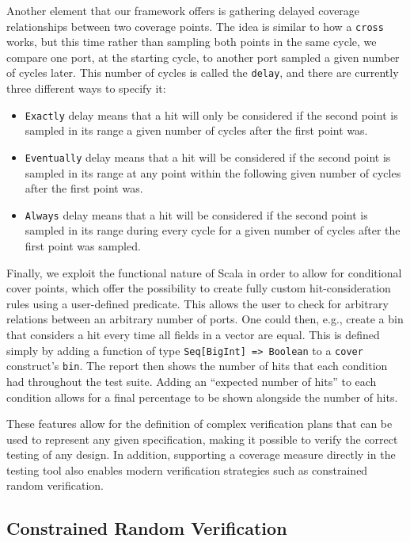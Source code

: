 \documentclass[conference]{IEEEtran}
\begin{document}
Another element that our framework offers is gathering delayed coverage relationships between two coverage points. 
The idea is similar to how a \texttt{cross} works, but this time rather than sampling both points in the same cycle, we compare one port, at the starting cycle, to another port sampled a given number of cycles later. 
This number of cycles is called the \texttt{delay}, and there are currently three different ways to specify it:  
\begin{itemize}
  \item \texttt{Exactly} delay means that a hit will only be considered if the second point is sampled in its range a given number of cycles after the first point was.
  \item \texttt{Eventually} delay means that a hit will be considered if the second point is sampled in its range at any point within the following given number of cycles after the first point was.  
  \item \texttt{Always} delay means that a hit will be considered if the second point is sampled in its range during every cycle for a given number of cycles after the first point was sampled.
\end{itemize}

Finally, we exploit the functional nature of Scala in order to allow for conditional cover points, which offer the possibility to create fully custom hit-consideration rules using a user-defined predicate. 
This allows the user to check for arbitrary relations between an arbitrary number of ports. 
One could then, e.g., create a bin that considers a hit every time all fields in a vector are equal. 
This is defined simply by adding a function of type \texttt{Seq[BigInt] => Boolean} to a \texttt{cover} construct's \texttt{bin}.
The report then shows the number of hits that each condition had throughout the test suite.
Adding an ``expected number of hits'' to each condition allows for a final percentage to be shown alongside the number of hits.

These features allow for the definition of complex verification plans that can be used to represent any given specification, making it possible to verify the correct testing of any design.
In addition, supporting a coverage measure directly in the testing tool also enables modern verification strategies such as constrained random verification.

\subsection{Constrained Random Verification}
\end{document}
